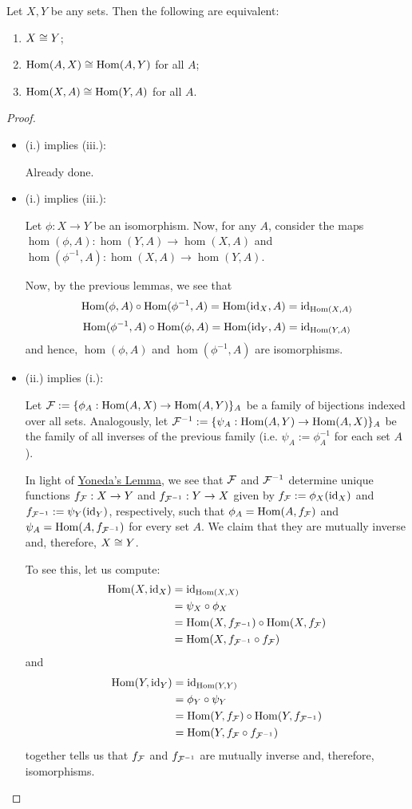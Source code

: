 \begin{cor}
	Let $X,Y$ be any sets. Then the following are equivalent:
	\begin{enumerate}[(i.)]
		\item $X\cong Y$;
		\item $\mathrm{Hom}(A,X)\cong\mathrm{Hom}(A,Y)$ for all $A$;
		\item $\mathrm{Hom}(X,A)\cong\mathrm{Hom}(Y,A)$ for all $A$.
	\end{enumerate}
\end{cor}
\begin{proof}
	\begin{itemize}
		\item (i.) implies (iii.):
		
		Already done.
		
		\item (i.) implies (iii.):
		
		Let $\phi:X\to Y$ be an isomorphism. Now, for any $A$, consider the maps $\hom(\phi,A):\hom(Y,A)\to\hom(X,A)$ and $\hom(\phi^{-1},A):\hom(X,A)\to\hom(Y,A)$.
		
		Now, by the previous lemmas, we see that $$\mathrm{Hom}(\phi,A)\circ\mathrm{Hom}(\phi^{-1},A)=\mathrm{Hom}({\rm id}_X,A)={\rm id}_{\mathrm{Hom}(X,A)}$$ $$\mathrm{Hom}(\phi^{-1},A)\circ\mathrm{Hom}(\phi,A)=\mathrm{Hom}({\rm id}_Y,A)={\rm id}_{\mathrm{Hom}(Y,A)}$$and hence, $\hom(\phi,A)$ and $\hom(\phi^{-1},A)$ are isomorphisms.
		
		\item (ii.) implies (i.):
		
		Let $\mathcal F:=\{\phi_A:\mathrm{Hom}(A,X)\to\mathrm{Hom}(A,Y)\}_A$ be a family of bijections indexed over all sets. Analogously, let $\mathcal F^{-1}:=\{\psi_A:\mathrm{Hom}(A,Y)\to\mathrm{Hom}(A,X)\}_A$ be the family of all inverses of the previous family (i.e. $\psi_A:=\phi_A^{-1}$ for each set $A$).
		
		In light of \hyperref[thm:yoneda]{Yoneda's Lemma}, we see that $\mathcal F$ and $\mathcal F^{-1}$ determine unique functions $f_\mathcal F:X\to Y$ and $f_{\mathcal F^{-1}}:Y\to X$ given by $f_\mathcal F:=\phi_X({\rm id}_X)$ and $f_{\mathcal F^{-1}}:=\psi_Y({\rm id}_Y)$, respectively, such that $\phi_A=\mathrm{Hom}(A,f_{\mathcal F})$ and $\psi_A=\mathrm{Hom}(A,f_{\mathcal F^{-1}})$ for every set $A$. We claim that they are mutually inverse and, therefore, $X\cong Y$.
		
		To see this, let us compute:
		\begin{align*}
			\mathrm{Hom}(X,{\rm id}_X)&={\rm id}_{\mathrm{Hom}(X,X)}\\
			&=\psi_X\circ\phi_X\\
			&=\mathrm{Hom}(X,f_{\mathcal F^{-1}})\circ\mathrm{Hom}(X,f_{\mathcal F})\\
			&=\mathrm{Hom}(X,f_{\mathcal F^{-1}}\circ f_{\mathcal F})
		\end{align*}
		and
		\begin{align*}
		\mathrm{Hom}(Y,{\rm id}_Y)&={\rm id}_{\mathrm{Hom}(Y,Y)}\\
		&=\phi_Y\circ\psi_Y\\
		&=\mathrm{Hom}(Y,f_{\mathcal F})\circ\mathrm{Hom}(Y,f_{\mathcal F^{-1}})\\
		&=\mathrm{Hom}(Y,f_{\mathcal F}\circ f_{\mathcal F^{-1}})
		\end{align*}together tells us that $f_{\mathcal F}$ and $f_{\mathcal F^{-1}}$ are mutually inverse and, therefore, isomorphisms.
		

\end{itemize}
\end{proof}
